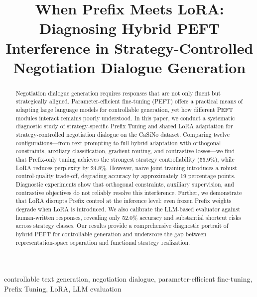 \documentclass[conference]{IEEEtran}
\begin{document}
\title{When Prefix Meets LoRA: Diagnosing Hybrid PEFT Interference in Strategy-Controlled Negotiation Dialogue Generation}

\author{
}

\maketitle

\begin{abstract}
Negotiation dialogue generation requires responses that are not only fluent but strategically aligned. Parameter-efficient fine-tuning (PEFT) offers a practical means of adapting large language models for controllable generation, yet how different PEFT modules interact remains poorly understood. In this paper, we conduct a systematic diagnostic study of strategy-specific Prefix Tuning and shared LoRA adaptation for strategy-controlled negotiation dialogue on the CaSiNo dataset. Comparing twelve configurations---from text prompting to full hybrid adaptation with orthogonal constraints, auxiliary classification, gradient routing, and contrastive losses---we find that Prefix-only tuning achieves the strongest strategy controllability (55.9\%), while LoRA reduces perplexity by 24.8\%. However, naive joint training introduces a robust control-quality trade-off, degrading accuracy by approximately 19 percentage points. Diagnostic experiments show that orthogonal constraints, auxiliary supervision, and contrastive objectives do not reliably resolve this interference. Further, we demonstrate that LoRA disrupts Prefix control at the inference level: even frozen Prefix weights degrade when LoRA is introduced. We also calibrate the LLM-based evaluator against human-written responses, revealing only 52.0\% accuracy and substantial shortcut risks across strategy classes. Our results provide a comprehensive diagnostic portrait of hybrid PEFT for controllable generation and underscore the gap between representation-space separation and functional strategy realization.
\end{abstract}

\begin{IEEEkeywords}
controllable text generation, negotiation dialogue, parameter-efficient fine-tuning, Prefix Tuning, LoRA, LLM evaluation
\end{IEEEkeywords}
\end{document}
